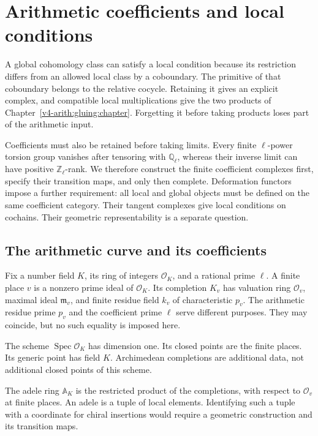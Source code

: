 \chapter{Arithmetic coefficients and local conditions}
\label{v4-arith:coefficients:chapter}

A global cohomology class can satisfy a local condition because its
restriction differs from an allowed local class by a coboundary. The
primitive of that coboundary belongs to the relative cocycle. Retaining
it gives an explicit complex, and compatible local multiplications give
the two products of Chapter~\ref{v4-arith:gluing:chapter}. Forgetting it
before taking products loses part of the arithmetic input.

Coefficients must also be retained before taking limits. Every finite
\(\ell\)-power torsion group vanishes after tensoring with
\(\mathbb Q_\ell\), whereas their inverse limit can have positive
\(\mathbb Z_\ell\)-rank. We therefore construct the finite coefficient
complexes first, specify their transition maps, and only then complete.
Deformation functors impose a further requirement: all local and global
objects must be defined on the same coefficient category. Their tangent
complexes give local conditions on cochains. Their geometric
representability is a separate question.

\section{The arithmetic curve and its coefficients}
\label{v4-arith:coefficients:sec:places}

Fix a number field \(K\), its ring of integers \(\mathcal O_K\), and a
rational prime \(\ell\). A finite place \(v\) is a nonzero prime ideal
of \(\mathcal O_K\). Its completion \(K_v\) has valuation ring
\(\mathcal O_v\), maximal ideal \(\mathfrak m_v\), and finite residue
field \(k_v\) of characteristic \(p_v\). The arithmetic residue prime
\(p_v\) and the coefficient prime \(\ell\) serve different purposes.
They may coincide, but no such equality is imposed here.

The scheme \(\operatorname{Spec}\mathcal O_K\) has dimension one.
Its closed points are the finite places. Its generic point has field
\(K\). Archimedean completions are additional data, not additional
closed points of this scheme.

The adele ring \(\mathbb A_K\) is the
restricted product of the completions, with respect to \(\mathcal O_v\)
at finite places. An adele is a tuple of local elements. Identifying
such a tuple with a coordinate for chiral insertions would require a
geometric construction and its transition maps.

